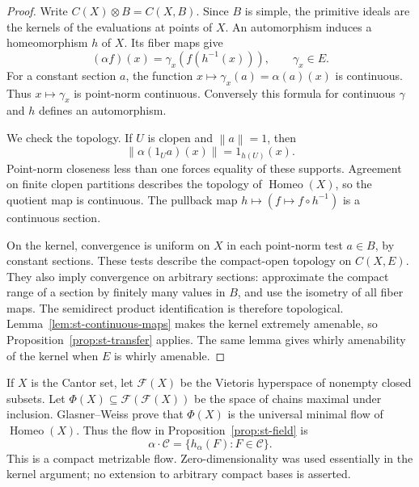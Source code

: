 \begin{proof}
Write $C(X)\otimes B=C(X,B)$. Since $B$ is simple, the primitive ideals are
the kernels of the evaluations at points of $X$. An automorphism induces a
homeomorphism $h$ of $X$. Its fiber maps give 
\begin{equation*}
(\alpha f)(x)=\gamma_x(f(h^{-1}(x))),\qquad  \gamma_x\in E. 
\end{equation*}
For a constant section $a$, the function $x\mapsto\gamma_x(a)=\alpha(a)(x)$
is continuous. Thus $x\mapsto\gamma_x$ is point-norm continuous. Conversely
this formula for continuous $\gamma$ and $h$ defines an automorphism.

We check the topology. If $U$ is clopen and $\left\|a\right\|=1$, then 
\begin{equation*}
\left\|\alpha(1_Ua)(x)\right\|=1_{h(U)}(x). 
\end{equation*}
Point-norm closeness less than one forces equality of these supports.
Agreement on finite clopen partitions describes the topology of $\operatorname{Homeo}(X)$,
so the quotient map is continuous. The pullback map $h\mapsto(f\mapsto
f\circ h^{-1})$ is a continuous section.

On the kernel, convergence is uniform on $X$ in each point-norm test $a\in B$, by constant sections. These tests describe the compact-open topology on $C(X,E)$. They also imply convergence on arbitrary sections: approximate the
compact range of a section by finitely many values in $B$, and use the
isometry of all fiber maps. The semidirect product identification is
therefore topological. Lemma~\ref{lem:st-continuous-maps} makes the kernel
extremely amenable, so Proposition~\ref{prop:st-transfer} applies.
The same lemma gives whirly amenability of the kernel when $E$ is whirly
amenable.
\end{proof}

If $X$ is the Cantor set, let $\mathcal{F}(X)$ be the Vietoris hyperspace of
nonempty closed subsets. Let $\Phi(X)\subseteq\mathcal{F}(\mathcal{F}(X))$
be the space of chains maximal under inclusion. Glasner--Weiss \cite[Theorem
6.1]{GlasnerWeiss2003} prove that $\Phi(X)$ is the universal minimal flow of $\operatorname{Homeo} (X)$. Thus the flow in Proposition~\ref{prop:st-field} is 
\begin{equation*}
\alpha\cdot\mathcal{C}=\{h_\alpha(F):F\in\mathcal{C}\}. 
\end{equation*}
This is a compact metrizable flow. Zero-dimensionality was used essentially
in the kernel argument; no extension to arbitrary compact bases is asserted.

